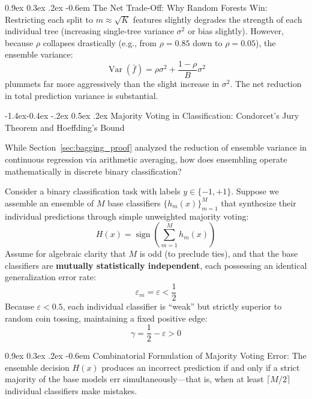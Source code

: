 \documentclass[11pt,a4paper]{article}
\makeatletter
\renewcommand\subsection{\@startsection{subsection}{2}{\z@}%
                                     {-1.4ex\@plus -0.4ex \@minus -.2ex}%
                                     {0.5ex \@plus .2ex}%
                                     {\normalfont\normalsize\bfseries}}
\renewcommand\paragraph{\@startsection{paragraph}{4}{\z@}%
                                     {0.9ex \@plus0.3ex \@minus.2ex}%
                                     {-0.6em}%
                                     {\normalfont\normalsize\bfseries}}
\newcommand{\Var}{\operatorname{Var}}
\newcommand{\sign}{\operatorname{sign}}
\makeatother
\begin{document}
\paragraph{The Net Trade-Off: Why Random Forests Win:}
Restricting each split to $m \approx \sqrt{K}$ features slightly degrades the strength of each individual tree (increasing single-tree variance $\sigma^2$ or bias slightly). However, because $\rho$ collapses drastically (e.g., from $\rho = 0.85$ down to $\rho = 0.05$), the ensemble variance:
\begin{equation}
    \Var(\bar{f}) = \rho \sigma^2 + \frac{1-\rho}{B}\sigma^2
\end{equation}
plummets far more aggressively than the slight increase in $\sigma^2$. The net reduction in total prediction variance is substantial.

\subsection{Majority Voting in Classification: Condorcet's Jury Theorem and Hoeffding's Bound}
\label{sec:condorcet_hoeffding}

While Section~\ref{sec:bagging_proof} analyzed the reduction of ensemble variance in continuous regression via arithmetic averaging, how does ensembling operate mathematically in discrete binary classification?

Consider a binary classification task with labels $y \in \{-1, +1\}$. Suppose we assemble an ensemble of $M$ base classifiers $\{h_m(x)\}_{m=1}^M$ that synthesize their individual predictions through simple unweighted majority voting:
\begin{equation}
    H(x) = \sign\left( \sum_{m=1}^M h_m(x) \right)
\end{equation}
Assume for algebraic clarity that $M$ is odd (to preclude ties), and that the base classifiers are \textbf{mutually statistically independent}, each possessing an identical generalization error rate:
\begin{equation}
    \varepsilon_m = \varepsilon < \frac{1}{2}
\end{equation}
Because $\varepsilon < 0.5$, each individual classifier is ``weak'' but strictly superior to random coin tossing, maintaining a fixed positive edge:
\begin{equation}
    \gamma = \frac{1}{2} - \varepsilon > 0
\end{equation}

\paragraph{Combinatorial Formulation of Majority Voting Error:}
The ensemble decision $H(x)$ produces an incorrect prediction if and only if a strict majority of the base models err simultaneously---that is, when at least $\lceil M / 2 \rceil$ individual classifiers make mistakes.
\end{document}
